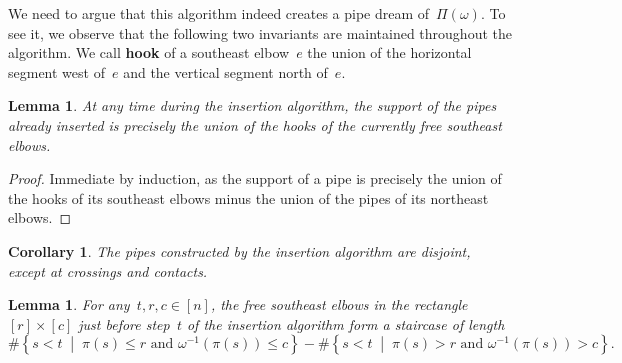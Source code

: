\documentclass[reqno]{amsart}
\newtheorem{corollary}[theorem]{Corollary}
\newtheorem{lemma}[theorem]{Lemma}
\theoremstyle{definition}
\newcommand{\set}[2]{\left\{ #1 \;\middle|\; #2 \right\}} %
\newcommand{\defn}[1]{\textbf{\textsf{\color{PineGreen} #1}}} %
\newcommand{\pipeDreams}{\Pi} %
\begin{document}
We need to argue that this algorithm indeed creates a pipe dream of~$\pipeDreams(\omega)$.
To see it, we observe that the following two invariants are maintained throughout the algorithm.
We call \defn{hook} of a southeast elbow~$e$ the union of the horizontal segment west of~$e$ and the vertical segment north of~$e$.

\begin{lemma}
\label{lem:disjointPipesInsertionAlgorithm}
At any time during the insertion algorithm, the support of the pipes already inserted is precisely the union of the hooks of the currently free southeast elbows.
\end{lemma}

\begin{proof}
Immediate by induction, as the support of a pipe is precisely the union of the hooks of its southeast elbows minus the union of the pipes of its northeast elbows.
\end{proof}

\begin{corollary}
\label{coro:disjointPipesInsertionAlgorithm}
The pipes constructed by the insertion algorithm are disjoint, except at crossings and contacts.
\end{corollary}

\begin{lemma}
\label{lem:rectangleInsertionAlgorithm}
For any~$t, r, c \in [n]$, the free southeast elbows in the rectangle~$[r] \times [c]$ just before step~$t$ of the insertion algorithm form a staircase of length
\[
\# \set{s < t}{\pi(s) \le r \text{ and } \omega^{-1}(\pi(s)) \le c} - \# \set{s < t}{\pi(s) > r \text{ and } \omega^{-1}(\pi(s)) > c}.
\]
\end{lemma}
\end{document}
